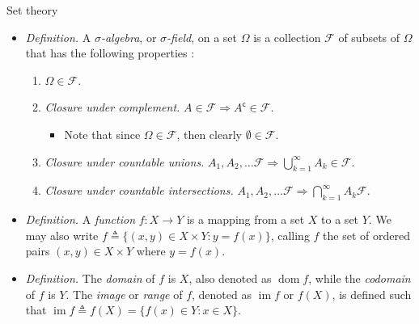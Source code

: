 \documentclass{beamer}
\begin{document}
\begin{frame}{Set theory}
    \begin{itemize}
        \item
        \textit{Definition.} A  $ \sigma $\textit{-algebra}, or
        $ \sigma $\textit{-field}, on a set $ \Omega $ is a collection
        $ \mathcal{F} $ of subsets of $ \Omega $ that has the following
        properties \cite{tamuz_prob}:
        \begin{enumerate}
            \item
            $ \Omega \in \mathcal{F} $.

            \item
            \textit{Closure under complement.} $ A \in \mathcal{F} \Rightarrow
            A^\mathsf{c} \in \mathcal{F} $.
            \begin{itemize}
                \item
                Note that since $ \Omega \in \mathcal{F} $, then clearly
                $ \emptyset \in \mathcal{F} $.
            \end{itemize}

            \item
            \textit{Closure under countable unions.} $ A_1, A_2, \ldots
            \mathcal{F} \Rightarrow \bigcup_{k = 1}^\infty
            A_k \in \mathcal{F} $.

            \item
            \textit{Closure under countable intersections.} $ A_1, A_2,
            \ldots \mathcal{F} \Rightarrow \bigcap_{k = 1}^\infty A_k
            \mathcal{F} $.
        \end{enumerate}

        \item
        \textit{Definition.} A \textit{function} $ f : X \rightarrow Y $ is a
        mapping from a set $ X $ to a set $ Y $. We may also write
        $ f \triangleq \{(x, y) \in X \times Y : y = f(x)\} $, calling $ f $
        the set of ordered pairs $ (x, y) \in X \times Y $ where $ y = f(x) $.

        \item
        \textit{Definition.} The \textit{domain} of $ f $ is $ X $, also
        denoted as $ \operatorname{dom} f $, while the \textit{codomain} of
        $ f $ is $ Y $. The \textit{image} or \textit{range} of $ f $, denoted
        as $ \operatorname{im} f $ or $ f(X) $, is defined such that
        $ \operatorname{im} f \triangleq f(X) = \{f(x) \in Y : x \in X\} $.
    \end{itemize}
\end{frame}
\end{document}
